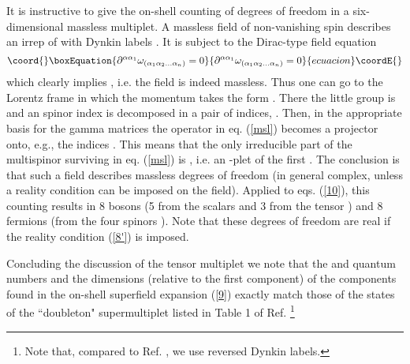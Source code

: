 \documentclass[a4paper,12pt]{article}
\begin{document}
It is instructive to give the on-shell counting of degrees of 
freedom in a  six-dimensional massless multiplet. A massless field 
of non-vanishing spin 
\coordHE{} describes an irrep 
of \coordHE{} with Dynkin labels \coordHE{}. It is subject to the 
Dirac-type field equation 
\begin{equation}\coord{}\boxEquation{\label{msl}
  \partial^{\alpha\alpha_1} 
\omega_{(\alpha_1\alpha_2\ldots\alpha_n)} = 0
}{\partial^{\alpha\alpha_1} 
\omega_{(\alpha_1\alpha_2\ldots\alpha_n)} = 0
}{ecuacion}\coordE{}\end{equation}
which clearly implies 
\coordHE{}, i.e. the 
field is indeed massless. Thus one can go to the Lorentz frame in 
which the momentum takes the form \coordHE{}. There 
the little group is \coordHE{} and an  
\coordHE{} spinor index is decomposed in a pair of \coordHE{} indices, 
\coordHE{}. Then, in the appropriate basis for the gamma 
matrices the operator \coordHE{} in eq. (\ref{msl}) becomes a 
projector onto, e.g., the indices \coordHE{}. This means that the only 
\coordHE{} irreducible part of the multispinor 
\coordHE{} surviving in eq. 
(\ref{msl}) is \coordHE{}, i.e. an \coordHE{}-plet of 
the first \coordHE{}. The conclusion is that such a field describes 
\coordHE{} massless degrees of freedom (in general complex, unless a 
reality condition can be imposed on the field). Applied to eqs. 
(\ref{10}), this counting results in 8 bosons (5 from the scalars 
\coordHE{} and 3 from the tensor \coordHE{}) and 8 
fermions (from the four spinors \coordHE{}). Note that these 
degrees of freedom are real if the reality condition (\ref{8'}) is 
imposed. 

Concluding the discussion of the tensor multiplet we note that the 
\coordHE{} and \coordHE{} quantum numbers and the 
dimensions (relative to the first component) of the components 
found in the on-shell superfield expansion (\ref{9}) exactly match 
those of the states of the ``doubleton" supermultiplet listed in 
Table 1 of Ref. \cite{GT} \footnote{Note that, compared to Ref. \cite{GT}, we
use reversed Dynkin labels.}
 
\end{document}
